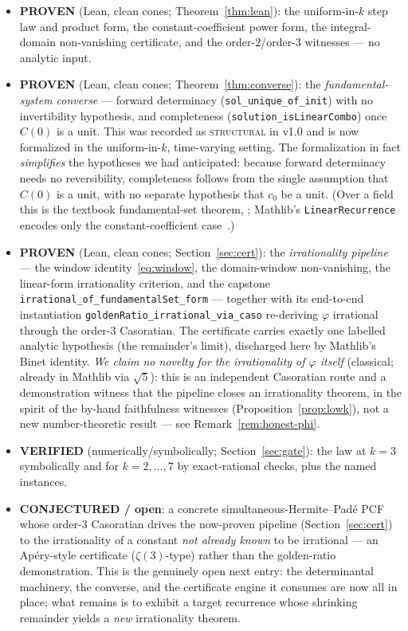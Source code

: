 \documentclass[11pt]{article}
\newcommand{\Caso}{C}
\begin{document}
\begin{itemize}
\item \textbf{PROVEN} (Lean, clean cones; Theorem~\ref{thm:lean}): the uniform-in-$k$
step law and product form, the constant-coefficient power form, the integral-domain
non-vanishing certificate, and the order-$2$/order-$3$ witnesses --- no analytic input.
\item \textbf{PROVEN} (Lean, clean cones; Theorem~\ref{thm:converse}): the
\emph{fundamental-system converse} --- forward determinacy
(\texttt{sol\_unique\_of\_init}) with no invertibility hypothesis, and completeness
(\texttt{solution\_isLinearCombo}) once $\Caso(0)$ is a unit. This was recorded as
\textsc{structural} in v1.0 and is now formalized in the uniform-in-$k$, time-varying
setting. The formalization in fact \emph{simplifies} the hypotheses we had anticipated:
because forward determinacy needs no reversibility, completeness follows from the
single assumption that $\Caso(0)$ is a unit, with no separate hypothesis that $c_0$ be a
unit. (Over a field this is the textbook fundamental-set theorem,
\cite[Ch.~2]{elaydi}; Mathlib's \texttt{LinearRecurrence} encodes only the
constant-coefficient case~\cite{mathlib}.)
\item \textbf{PROVEN} (Lean, clean cones; Section~\ref{sec:cert}): the
\emph{irrationality pipeline} --- the window identity~\eqref{eq:window}, the
domain-window non-vanishing, the linear-form irrationality criterion, and the capstone
\texttt{irrational\_of\_fundamentalSet\_form} --- together with its end-to-end
instantiation \texttt{goldenRatio\_irrational\_via\_caso} re-deriving $\varphi$
irrational through the order-$3$ Casoratian. The certificate carries exactly one
labelled analytic hypothesis (the remainder's limit), discharged here by Mathlib's
Binet identity. \emph{We claim no novelty for the irrationality of $\varphi$ itself}
(classical; already in Mathlib via $\sqrt5$): this is an independent Casoratian route
and a demonstration witness that the pipeline closes an irrationality theorem, in the
spirit of the by-hand faithfulness witnesses (Proposition~\ref{prop:lowk}), not a new
number-theoretic result --- see Remark~\ref{rem:honest-phi}.
\item \textbf{VERIFIED} (numerically/symbolically; Section~\ref{sec:gate}): the law at
$k=3$ symbolically and for $k=2,\dots,7$ by exact-rational checks, plus the named
instances.
\item \textbf{CONJECTURED / open}: a concrete simultaneous-Hermite--Pad\'e PCF whose
order-$3$ Casoratian drives the now-proven pipeline (Section~\ref{sec:cert}) to the
irrationality of a constant \emph{not already known} to be irrational --- an
Ap\'ery-style certificate ($\zeta(3)$-type) rather than the golden-ratio demonstration.
This is the genuinely open next entry: the determinantal machinery, the converse, and
the certificate engine it consumes are now all in place; what remains is to exhibit a
target recurrence whose shrinking remainder yields a \emph{new} irrationality theorem.
\end{itemize}
\end{document}
